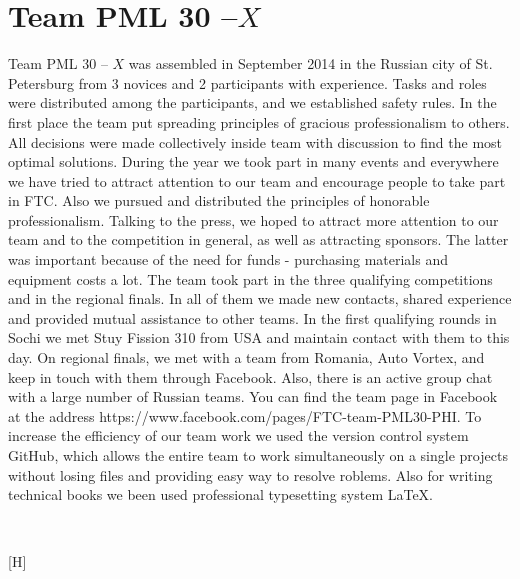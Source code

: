 
\section{Team PML 30 --${X}$} 
	Team PML 30 -- ${X}$ was assembled in September 2014 in the Russian city of St. Petersburg from 3 novices and 2 participants with experience. Tasks and roles were distributed among the participants, and we established safety rules. In the first place the team put spreading principles of gracious professionalism to others. All decisions were made collectively inside team with discussion to find the most optimal solutions. 
	During the year we took part in many events and everywhere we have tried to attract attention to our team and encourage people to take part in FTC. Also we pursued and distributed the principles of honorable professionalism. Talking to the press, we hoped to attract more attention to our team and to the competition in general, as well as attracting sponsors. The latter was important because of the need for funds - purchasing materials and equipment costs a lot.
	The team took part in the three qualifying competitions and in the regional finals. In all of them we made new contacts, shared experience and provided mutual assistance to other teams. In the first qualifying rounds in Sochi we met Stuy Fission 310 from USA and maintain contact with them to this day. On regional finals, we met with a team from Romania, Auto Vortex, and keep in touch with them through Facebook. Also, there is an active group chat with a large number of Russian teams. You can find the team page in Facebook at the address https://www.facebook.com/pages/FTC-team-PML30-PHI.
	To increase the efficiency of our team work we used the version control system GitHub, which allows the entire team to work simultaneously on a single projects without losing files and providing easy way to resolve roblems. Also for writing technical books we been used professional typesetting system LaTeX.
	\begin{figure}[H]
		\\
	\end{figure}[H]
\fillpage


